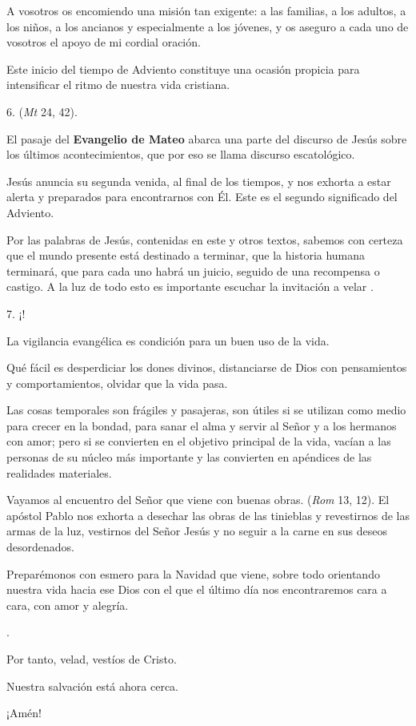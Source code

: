 \begin{body}
					A vosotros os encomiendo una misión tan exigente: a las familias, a los adultos, a los niños, a los ancianos y especialmente a los jóvenes, y os aseguro a cada uno de vosotros el apoyo de mi cordial oración. 
					
					Este inicio del tiempo de Adviento constituye una ocasión propicia para intensificar el ritmo de nuestra vida cristiana. 
					
					6.  (\emph{Mt} 24, 42). 
					
					El pasaje del \textbf{Evangelio de Mateo} abarca una parte del discurso de Jesús sobre los últimos acontecimientos, que por eso se llama discurso escatológico. 
					
					Jesús anuncia su segunda venida, al final de los tiempos, y nos exhorta a estar alerta y preparados para encontrarnos con Él. Este es el segundo significado del Adviento. 
					
					Por las palabras de Jesús, contenidas en este y otros textos, sabemos con certeza que el mundo presente está destinado a terminar, que la historia humana terminará, que para cada uno habrá un juicio, seguido de una recompensa o castigo. A la luz de todo esto es importante escuchar la invitación a velar . 
					
					7. ¡! 
					
					La vigilancia evangélica es condición para un buen uso de la vida. 
					
					Qué fácil es desperdiciar los dones divinos, distanciarse de Dios con pensamientos y comportamientos, olvidar que la vida pasa. 
					
					Las cosas temporales son frágiles y pasajeras, son útiles si se utilizan como medio para crecer en la bondad, para sanar el alma y servir al Señor y a los hermanos con amor; pero si se convierten en el objetivo principal de la vida, vacían a las personas de su núcleo más importante y las convierten en apéndices de las realidades materiales. 
					
					Vayamos al encuentro del Señor que viene con buenas obras.  (\emph{Rom} 13, 12). El apóstol Pablo nos exhorta a desechar las obras de las tinieblas y revestirnos de las armas de la luz, vestirnos del Señor Jesús y no seguir a la carne en sus deseos desordenados. 
					
					Preparémonos con esmero para la Navidad que viene, sobre todo orientando nuestra vida hacia ese Dios con el que el último día nos encontraremos cara a cara, con amor y alegría. 
					
					. 
					
					Por tanto, velad, vestíos de Cristo. 
					
					Nuestra salvación está ahora cerca. 
					
					¡Amén!
				\end{body}
		
